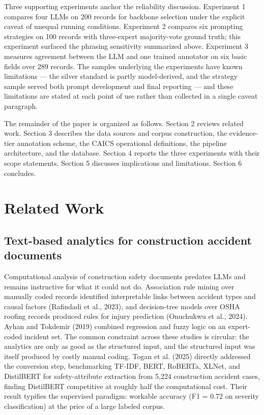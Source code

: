 \documentclass[11pt]{article}
\begin{document}
Three supporting experiments anchor the reliability discussion. Experiment 1 compares four LLMs on 200 records for backbone selection under the explicit caveat of unequal running conditions. Experiment 2 compares six prompting strategies on 100 records with three-expert majority-vote ground truth; this experiment surfaced the phrasing sensitivity summarized above. Experiment 3 measures agreement between the LLM and one trained annotator on six basic fields over 289 records. The samples underlying the experiments have known limitations --- the silver standard is partly model-derived, and the strategy sample served both prompt development and final reporting --- and these limitations are stated at each point of use rather than collected in a single caveat paragraph.

The remainder of the paper is organized as follows. Section 2 reviews related work. Section 3 describes the data sources and corpus construction, the evidence-tier annotation scheme, the CAICS operational definitions, the pipeline architecture, and the database. Section 4 reports the three experiments with their scope statements. Section 5 discusses implications and limitations. Section 6 concludes.

\section{Related Work}
\subsection{Text-based analytics for construction accident documents}
Computational analysis of construction safety documents predates LLMs and remains instructive for what it could not do. Association rule mining over manually coded records identified interpretable links between accident types and causal factors (Rafindadi et al., 2023), and decision-tree models over OSHA roofing records produced rules for injury prediction (Onuchukwu et al., 2024). Ayhan and Tokdemir (2019) combined regression and fuzzy logic on an expert-coded incident set. The common constraint across these studies is circular: the analytics are only as good as the structured input, and the structured input was itself produced by costly manual coding. Togan et al. (2025) directly addressed the conversion step, benchmarking TF-IDF, BERT, RoBERTa, XLNet, and DistilBERT for safety-attribute extraction from 5,224 construction accident cases, finding DistilBERT competitive at roughly half the computational cost. Their result typifies the supervised paradigm: workable accuracy (F1 = 0.72 on severity classification) at the price of a large labeled corpus.
\end{document}
